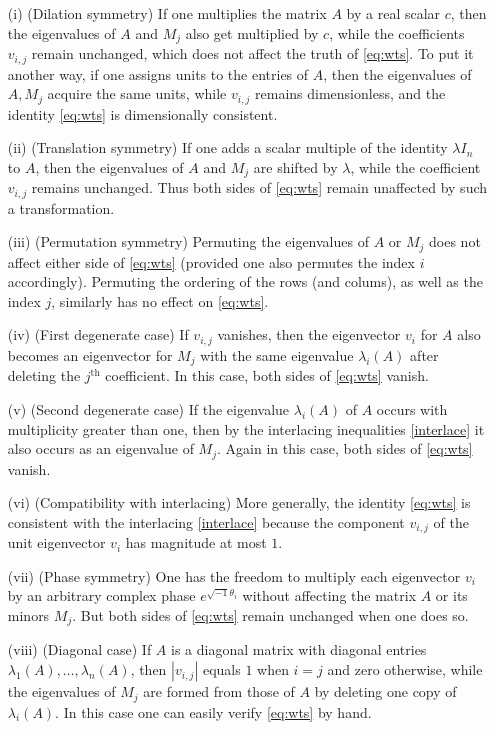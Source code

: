 \documentclass[12pt]{amsart}
\begin{document}
\begin{itemize}
\item[(i)] (Dilation symmetry) If one multiplies the matrix $A$ by a real scalar $c$, then the eigenvalues of $A$ and $M_j$ also get multiplied by $c$, while the coefficients $v_{i,j}$ remain unchanged, which does not affect the truth of \eqref{eq:wts}.  To put it another way, if one assigns units to the entries of $A$, then the eigenvalues of $A,M_j$ acquire the same units, while $v_{i,j}$ remains dimensionless, and the identity \eqref{eq:wts} is dimensionally consistent.
\item[(ii)] (Translation symmetry) If one adds a scalar multiple of the identity $\lambda I_n$ to $A$, then the eigenvalues of $A$ and $M_j$ are shifted by $\lambda$, while the coefficient $v_{i,j}$ remains unchanged.  Thus both sides of \eqref{eq:wts} remain unaffected by such a transformation.
\item[(iii)]  (Permutation symmetry) Permuting the eigenvalues of $A$ or $M_j$ does not affect either side of \eqref{eq:wts} (provided one also permutes the index $i$ accordingly).  Permuting the ordering of the rows (and colums), as well as the index $j$, similarly has no effect on \eqref{eq:wts}.
\item[(iv)]  (First degenerate case) If $v_{i,j}$ vanishes, then the eigenvector $v_i$ for $A$ also becomes an eigenvector for $M_j$ with the same eigenvalue $\lambda_i(A)$ after deleting the $j^{\mathrm{th}}$ coefficient.  In this case, both sides of \eqref{eq:wts} vanish.  
\item[(v)]  (Second degenerate case) If the eigenvalue $\lambda_i(A)$ of $A$ occurs with multiplicity greater than one, then by the interlacing inequalities \eqref{interlace} it also occurs as an eigenvalue of $M_j$.  Again in this case, both sides of \eqref{eq:wts} vanish.
\item[(vi)]  (Compatibility with interlacing) More generally, the identity \eqref{eq:wts} is consistent with the interlacing \eqref{interlace} because the component $v_{i,j}$ of the unit eigenvector $v_i$ has magnitude at most $1$.
\item[(vii)]  (Phase symmetry) One has the freedom to multiply each eigenvector $v_i$ by an arbitrary complex phase $e^{\sqrt{-1}\theta_i}$ without affecting the matrix $A$ or its minors $M_j$.  But both sides of \eqref{eq:wts} remain unchanged when one does so.
\item[(viii)]  (Diagonal case) If $A$ is a diagonal matrix with diagonal entries $\lambda_1(A),\dots,\lambda_n(A)$, then $|v_{i,j}|$ equals $1$ when $i=j$ and zero otherwise, while the eigenvalues of $M_j$ are formed from those of $A$ by deleting one copy of $\lambda_i(A)$.  In this case one can easily verify \eqref{eq:wts} by hand.

\end{itemize}
\end{document}
